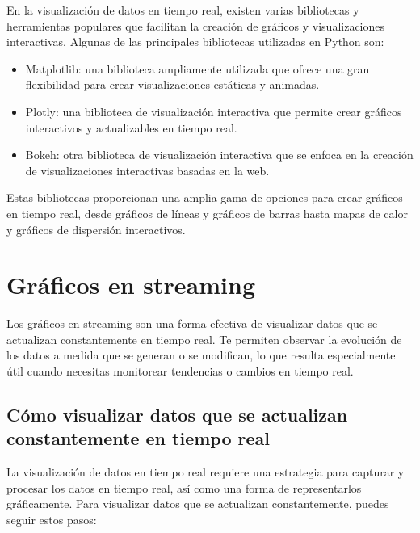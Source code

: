 \documentclass[
  a4paper,
]{article}
\begin{document}
En la visualización de datos en tiempo real, existen varias bibliotecas
y herramientas populares que facilitan la creación de gráficos y
visualizaciones interactivas. Algunas de las principales bibliotecas
utilizadas en Python son:

\begin{itemize}
\item
  Matplotlib: una biblioteca ampliamente utilizada que ofrece una gran
  flexibilidad para crear visualizaciones estáticas y animadas.
\item
  Plotly: una biblioteca de visualización interactiva que permite crear
  gráficos interactivos y actualizables en tiempo real.
\item
  Bokeh: otra biblioteca de visualización interactiva que se enfoca en
  la creación de visualizaciones interactivas basadas en la web.
\end{itemize}

Estas bibliotecas proporcionan una amplia gama de opciones para crear
gráficos en tiempo real, desde gráficos de líneas y gráficos de barras
hasta mapas de calor y gráficos de dispersión interactivos.

\hypertarget{gruxe1ficos-en-streaming}{%
\section{Gráficos en streaming}\label{gruxe1ficos-en-streaming}}

Los gráficos en streaming son una forma efectiva de visualizar datos que
se actualizan constantemente en tiempo real. Te permiten observar la
evolución de los datos a medida que se generan o se modifican, lo que
resulta especialmente útil cuando necesitas monitorear tendencias o
cambios en tiempo real.

\hypertarget{cuxf3mo-visualizar-datos-que-se-actualizan-constantemente-en-tiempo-real}{%
\subsection{Cómo visualizar datos que se actualizan constantemente en
tiempo
real}\label{cuxf3mo-visualizar-datos-que-se-actualizan-constantemente-en-tiempo-real}}

La visualización de datos en tiempo real requiere una estrategia para
capturar y procesar los datos en tiempo real, así como una forma de
representarlos gráficamente. Para visualizar datos que se actualizan
constantemente, puedes seguir estos pasos:
\end{document}
